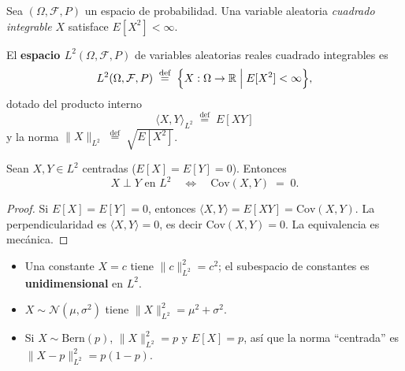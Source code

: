 Sea $(\Omega, \mathcal{F}, P)$ un espacio de probabilidad.  Una variable aleatoria
\emph{cuadrado integrable} $X$ satisface $E[X^2] < \infty$.

\begin{definition}[Espacio $L^2$]
	El \textbf{espacio $L^2(\Omega,\mathcal{F},P)$} de variables aleatorias reales
	cuadrado integrables es
	\[
	L^2(\Omega,\mathcal{F},P) \;\stackrel{\text{def}}{=}\;
	\Bigl\{ X : \Omega \to \mathbb{R} \;\Big|\; E[X^2] < \infty \Bigr\},
	\]
	dotado del producto interno
	\[
	\langle X, Y \rangle_{L^2} \;\stackrel{\text{def}}{=}\; E[XY]
	\]
	y la norma $\|X\|_{L^2} \;\stackrel{\text{def}}{=}\; \sqrt{E[X^2]}$.
\end{definition}

\begin{proposition}[Ortogonalidad = incorrelación]
	\label{prop:perp-incorr}
	Sean $X, Y \in L^2$ centradas ($E[X] = E[Y] = 0$).  Entonces
	\[
	X \perp Y \text{ en } L^2 \quad\Longleftrightarrow\quad
	\mathrm{Cov}(X, Y) \;=\; 0.
	\]
\end{proposition}

\begin{proof}
	Si $E[X] = E[Y] = 0$, entonces $\langle X, Y \rangle = E[XY] = \mathrm{Cov}(X,Y)$.
	La perpendicularidad es $\langle X, Y\rangle = 0$, es decir $\mathrm{Cov}(X,Y)=0$.
	La equivalencia es mecánica.
\end{proof}

\begin{example}[Vectores en $L^2$]
	\label{ex:l2-vectors}
	\begin{itemize}
		\item Una constante $X = c$ tiene $\|c\|_{L^2}^2 = c^2$; el subespacio de
		constantes es \textbf{unidimensional} en $L^2$.
		\item $X \sim \mathcal{N}(\mu,\sigma^2)$ tiene $\|X\|_{L^2}^2 = \mu^2+\sigma^2$.
		\item Si $X \sim \mathrm{Bern}(p)$, $\|X\|_{L^2}^2 = p$ y
		$E[X] = p$, así que la norma ``centrada'' es $\|X-p\|_{L^2}^2 = p(1-p)$.
	\end{itemize}
\end{example}

